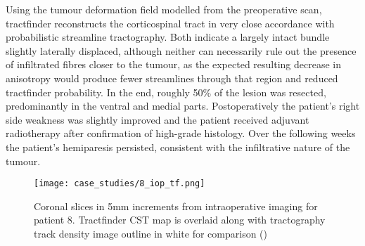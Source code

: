 Using the tumour deformation field modelled from the preoperative scan, tractfinder reconstructs the corticospinal tract in very close accordance with probabilistic streamline tractography.
Both indicate a largely intact bundle slightly laterally displaced, although neither can necessarily rule out the presence of infiltrated fibres closer to the tumour, as the expected resulting decrease in anisotropy would produce fewer streamlines through that region and reduced tractfinder probability.
In the end, roughly 50\% of the lesion was resected, predominantly in the ventral and medial parts.
Postoperatively the patient's right side weakness was slightly improved and the patient received adjuvant radiotherapy  after confirmation of high-grade histology.
Over the following weeks the patient's hemiparesis persisted, consistent with the infiltrative nature of the tumour.

\begin{figure}
  \texttt{[image: case\_studies/8\_iop\_tf.png]}
  \caption{Coronal slices in 5mm increments from intraoperative imaging for patient 8. Tractfinder CST map is overlaid along with tractography track density image outline in white for comparison ()}
  \label{fig:8i_tf}
\end{figure}
